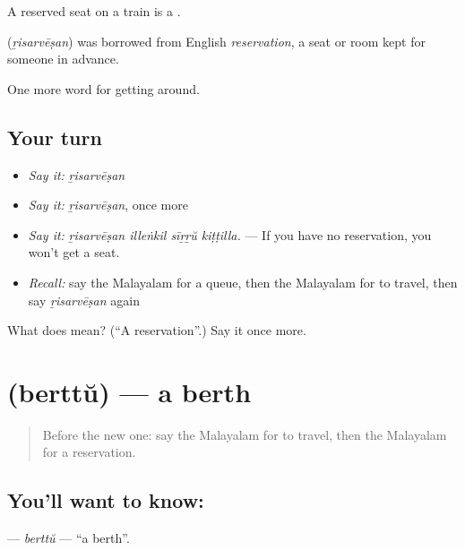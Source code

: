 A reserved seat on a train is a  .

\begin{cousinweb}
\textbf{} (\emph{ṟisarvēṣan}) was borrowed from English \emph{reservation}, a seat or room kept for someone in advance.
\end{cousinweb}

\begin{grammarlens}[title={What you've built}]
One more word for getting around.
\end{grammarlens}

\subsection*{Your turn}
\begin{itemize}
\raggedright
  \item \emph{Say it:} \emph{ṟisarvēṣan}
  \item \emph{Say it:} \emph{ṟisarvēṣan}, once more
  \item \emph{Say it:} \emph{ṟisarvēṣan illeṅkil sīṟṟŭ kiṭṭilla.} — If you have no reservation, you won't get a seat.
  \item \emph{Recall:} say the Malayalam for a queue, then the Malayalam for to travel, then say \emph{ṟisarvēṣan} again
\end{itemize}

\begin{tcolorbox}[breakable,colback=teal!4,colframe=teal!35!black,title={Before you move on}]
What does  mean? (\textquotedblleft{}A reservation\textquotedblright{}.) Say it once more.
\end{tcolorbox}
\section[\texorpdfstring{\ml{ബെർത്ത്} (berttŭ)}{ബെർത്ത് (berttŭ)}]{ (berttŭ) — a berth}

\label{lesson:ML-C462-berttu}



\begin{quote}
Before the new one: say the Malayalam for to travel, then the Malayalam for a reservation.
\end{quote}

\subsection*{You'll want to know: }
\textbf{} — \emph{berttŭ} — \textquotedblleft{}a berth\textquotedblright{}.

